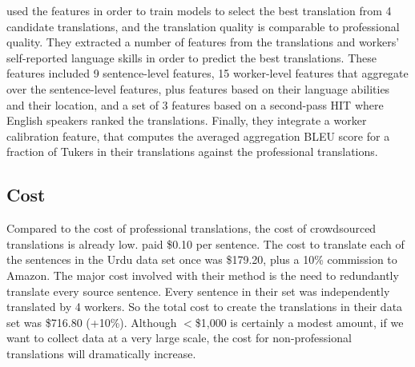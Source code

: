 \documentclass[11pt]{article}
\begin{document}
  used the features in order to train models to select the best translation from 4 candidate translations, and the translation quality is comparable to professional quality.
They extracted a number of features from the translations and workers' self-reported language skills in order to predict the best translations. These features included 9 sentence-level features,
15 worker-level features that aggregate over the sentence-level features, plus features based on their language abilities and their location, and a set of 3 features based on a second-pass HIT where English speakers ranked the translations.   Finally, they integrate a worker calibration feature, that computes the averaged aggregation BLEU score for a fraction of Tukers in their translations against the professional translations. 


\subsection{Cost}

Compared to the cost of professional translations, the cost of crowdsourced translations is already low.  paid \$0.10 per sentence.  The cost to translate each of the sentences in the Urdu data set once was \$179.20, plus a 10\% commission to Amazon.  The major cost involved with their method is the need to redundantly translate every source sentence. Every sentence in their set was independently translated by 4 workers.  So the total cost to create the translations in their data set was \$716.80 (+10\%). Although $<$\$1,000 is certainly a modest amount, if we want to collect data at a very large scale, the cost for non-professional translations will dramatically increase.
\end{document}
